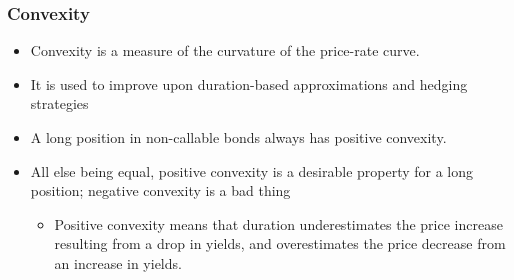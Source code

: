 \documentclass[10pt]{beamer}
\begin{document}
%	
%		
%	


\begin{frame}
	\frametitle{Convexity}
	
	\begin{itemize} \itemsep15pt
		\item Convexity is a measure of the curvature of the price-rate curve.
		
		\item It is used to improve upon duration-based approximations and hedging strategies
		
		\item A long position in non-callable bonds always has positive convexity.
		
		\item All else being equal, positive convexity is a desirable property for a long position; negative convexity is a bad thing 
		
		\begin{itemize} \itemsep10pt \vspace{10pt}
			\item Positive convexity means that duration underestimates the price increase resulting from a
			drop in yields, and overestimates the price decrease from an increase in yields.			
		\end{itemize}
	\end{itemize}
	
\end{frame}
\end{document}
